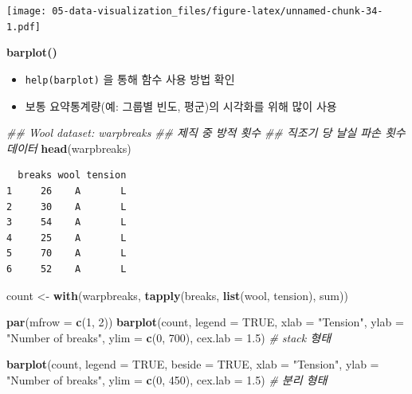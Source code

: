 \documentclass[
  11pt,
]{krantz}
\newenvironment{Shaded}{\begin{snugshade}}{\end{snugshade}}
\newcommand{\CommentTok}[1]{\textcolor[rgb]{0.37,0.37,0.37}{\textit{#1}}}
\newcommand{\DataTypeTok}[1]{\textcolor[rgb]{0.27,0.27,0.27}{#1}}
\newcommand{\DecValTok}[1]{\textcolor[rgb]{0.06,0.06,0.06}{#1}}
\newcommand{\FloatTok}[1]{\textcolor[rgb]{0.06,0.06,0.06}{#1}}
\newcommand{\KeywordTok}[1]{\textcolor[rgb]{0.27,0.27,0.27}{\textbf{#1}}}
\newcommand{\NormalTok}[1]{#1}
\newcommand{\OtherTok}[1]{\textcolor[rgb]{0.37,0.37,0.37}{#1}}
\newcommand{\StringTok}[1]{\textcolor[rgb]{0.5,0.5,0.5}{#1}}
\providecommand{\tightlist}{%
  \setlength{\itemsep}{0pt}\setlength{\parskip}{0pt}}
\begin{document}
\texttt{[image: 05-data-visualization\_files/figure-latex/unnamed-chunk-34-1.pdf]}

\normalsize

\textbf{barplot()}

\begin{itemize}
\tightlist
\item
  \texttt{help(barplot)} 을 통해 함수 사용 방법 확인
\item
  보통 요약통계량(예: 그룹별 빈도, 평군)의 시각화를 위해 많이 사용
\end{itemize}

\footnotesize

\begin{Shaded}
\begin{Highlighting}[]
\CommentTok{## Wool dataset: warpbreaks }
\CommentTok{## 제직 중 방적 횟수}
\CommentTok{## 직조기 당 날실 파손 횟수 데이터}
\KeywordTok{head}\NormalTok{(warpbreaks)}
\end{Highlighting}
\end{Shaded}

\begin{verbatim}
  breaks wool tension
1     26    A       L
2     30    A       L
3     54    A       L
4     25    A       L
5     70    A       L
6     52    A       L
\end{verbatim}

\begin{Shaded}
\begin{Highlighting}[]
\NormalTok{count <-}\StringTok{ }\KeywordTok{with}\NormalTok{(warpbreaks, }
              \KeywordTok{tapply}\NormalTok{(breaks, }\KeywordTok{list}\NormalTok{(wool, tension), }
\NormalTok{                     sum))}

\KeywordTok{par}\NormalTok{(}\DataTypeTok{mfrow =} \KeywordTok{c}\NormalTok{(}\DecValTok{1}\NormalTok{, }\DecValTok{2}\NormalTok{))}
\KeywordTok{barplot}\NormalTok{(count, }\DataTypeTok{legend =} \OtherTok{TRUE}\NormalTok{, }
        \DataTypeTok{xlab =} \StringTok{"Tension"}\NormalTok{, }
        \DataTypeTok{ylab =} \StringTok{"Number of breaks"}\NormalTok{, }
        \DataTypeTok{ylim =} \KeywordTok{c}\NormalTok{(}\DecValTok{0}\NormalTok{, }\DecValTok{700}\NormalTok{), }
        \DataTypeTok{cex.lab =} \FloatTok{1.5}\NormalTok{) }\CommentTok{# stack 형태}

\KeywordTok{barplot}\NormalTok{(count, }\DataTypeTok{legend =} \OtherTok{TRUE}\NormalTok{, }\DataTypeTok{beside =} \OtherTok{TRUE}\NormalTok{, }
        \DataTypeTok{xlab =} \StringTok{"Tension"}\NormalTok{, }
        \DataTypeTok{ylab =} \StringTok{"Number of breaks"}\NormalTok{, }
        \DataTypeTok{ylim =} \KeywordTok{c}\NormalTok{(}\DecValTok{0}\NormalTok{, }\DecValTok{450}\NormalTok{), }
        \DataTypeTok{cex.lab =} \FloatTok{1.5}\NormalTok{) }\CommentTok{# 분리 형태}
\end{Highlighting}
\end{Shaded}
\end{document}
